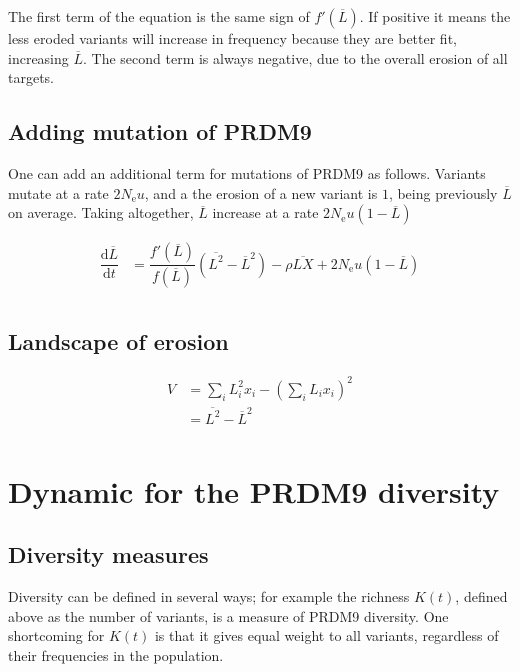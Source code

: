\documentclass{article}
\begin{document}
The first term of the equation is the same sign of $f'(\overline{L})$. If positive it means the less eroded variants will increase in frequency because they are better fit, increasing $\overline{L}$. The second term is always negative, due to the overall erosion of all targets.

\subsection{Adding mutation of PRDM9}

One can add an additional term for mutations of PRDM9 as follows. Variants mutate at a rate $2 N_\mathrm{e} u$, and a the erosion of a new variant is $1$, being previously $\overline{L}$ on average. Taking altogether, $\overline{L}$ increase at a rate  $2 N_\mathrm{e} u (1 - \overline{L})$

\begin{equation}
  \begin{aligned}
    \dfrac{\mathrm{d} \overline{L} }{\mathrm{d}t} &=
    \dfrac{f'(\overline{L})}{f(\overline{L})} (\overline{L^2} - \overline{L}^2) - \rho \overline{L X} + 2 N_\mathrm{e} u (1 - \overline{L})\\
  \end{aligned}
\end{equation}

\subsection{Landscape of erosion}

\begin{equation}
  \begin{aligned}
    V &=  \sum_i L_i^2 x_i  -  \left( \sum_i L_i x_i \right)^2 \\
    &=
    \overline{L^2} - \overline{L}^2 \\
  \end{aligned}
\end{equation}

\section{Dynamic for the PRDM9 diversity}

\subsection{Diversity measures}
Diversity can be defined in several ways; for example the richness $K(t)$, defined above as the number of variants, is a measure of PRDM9 diversity. One shortcoming for $K(t)$ is that it gives equal weight to all variants, regardless of their frequencies in the population. 
\end{document}
